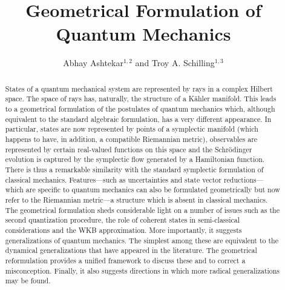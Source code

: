 \documentclass[12pt,aps,eqsecnum,tighten]{revtex4-2}
\begin{document}

\title{Geometrical Formulation of Quantum Mechanics}
\author{Abhay Ashtekar${}^{1,2}$ and Troy A. Schilling${}^{1,3}$}

\address{${}^1$ Center for Gravitational Physics and Geometry\\
Department of Physics, Penn State, 
University Park, PA 16802-6300, USA}
 
\address{${}^2$ Erwin Schr\"odinger International Institute for 
Mathematical Physics\\
Boltzmanngasse 9, A-1090 Vienna, Austria}

\address{${}^3$ Institute for Defense Analyses\\
1801 North Beauregard Street, Alexandria, VA 22311-1772}


\begin{abstract}
States of a quantum mechanical system are represented by rays in a
complex Hilbert space. The space of rays has, naturally, the structure
of a K\"ahler manifold. This leads to a geometrical formulation of the
postulates of quantum mechanics which, although equivalent to the
standard algebraic formulation, has a very different appearance.  In
particular, states are now represented by points of a symplectic
manifold (which happens to have, in addition, a compatible Riemannian
metric), observables are represented by certain real-valued functions
on this space and the Schr\"odinger evolution is captured by the
symplectic flow generated by a Hamiltonian function. There is thus a
remarkable similarity with the standard symplectic formulation of
classical mechanics. Features---such as uncertainties and state vector
reductions---which are specific to quantum mechanics can also be
formulated geometrically but now refer to the Riemannian metric---a
structure which is absent in classical mechanics. The geometrical
formulation sheds considerable light on a number of issues such as the
second quantization procedure, the role of coherent states in
semi-classical considerations and the WKB approximation.  More
importantly, it suggests generalizations of quantum mechanics. The
simplest among these are equivalent to the dynamical generalizations
that have appeared in the literature. The geometrical reformulation
provides a unified framework to discuss these and to correct a
misconception.  Finally, it also suggests directions in which more
radical generalizations may be found.  
\end{abstract}

\maketitle
\end{document}
